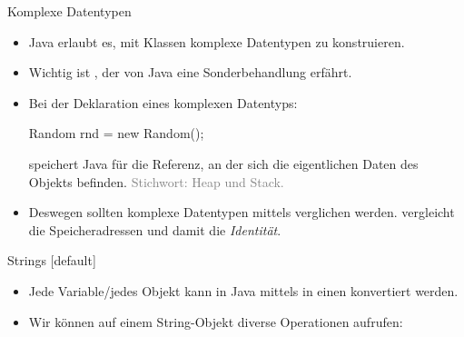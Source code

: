 \begin{frame}[fragile]{Komplexe Datentypen}
    \begin{itemize}[<+(1)->]
        \widei
        \item Java erlaubt es, mit Klassen komplexe Datentypen zu konstruieren.
        \item Wichtig ist , der von Java eine Sonderbehandlung erfährt.
        \item Bei der Deklaration eines komplexen Datentyps:\pause{}
\begin{plainjava}
Random rnd = new Random();
\end{plainjava}
        \pause{}speichert Java für  die Referenz,\pause{} an der sich die eigentlichen Daten des Objekts befinden. \textcolor{gray}{Stichwort: Heap und Stack.}
        \item Deswegen sollten komplexe Datentypen mittels  verglichen werden.\pause{} \bjava{==} vergleicht die Speicheradressen und damit die \emph{Identität}.
    \end{itemize}
\end{frame}

\begin{frame}{Strings}
    [default]%
    \begin{itemize}[<+(1)->]
        \widei
        \item Jede Variable\thinspace /\thinspace jedes Objekt kann in Java mittels  in einen  konvertiert werden.
        \item Wir können auf einem String-Objekt diverse Operationen aufrufen: 
    \end{itemize}
\end{frame}

